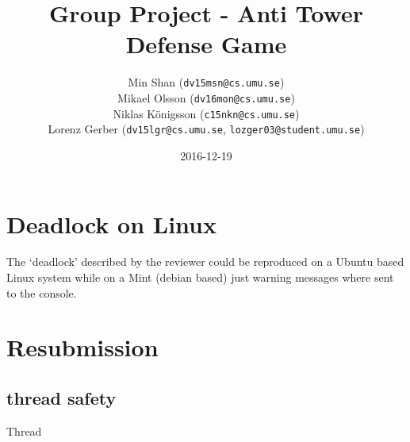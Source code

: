 \documentclass[a4paper,11pt,twoside]{article}
\title{Group Project - Anti Tower Defense Game}
\author{Min Shan ({\tt{dv15msn@cs.umu.se}}) \\ 
Mikael Olsson ({\tt{dv16mon@cs.umu.se}}) \\
Niklas Königsson ({\tt{c15nkn@cs.umu.se}}) \\
Lorenz Gerber ({\tt{dv15lgr@cs.umu.se}}, {\tt{lozger03@student.umu.se}})
}
\date{2016-12-19}
\begin{document}
\lstset{language=C}
\maketitle
\thispagestyle{empty}
\newpage
\tableofcontents
\thispagestyle{empty}
\newpage

\clearpage
{}
\section{Deadlock on Linux}
The `deadlock' described by the reviewer could be reproduced on a Ubuntu based Linux system while on a Mint (debian based) just warning messages where sent to the console. 
\section{Resubmission}
\subsection{thread safety}
Thread 







\end{document}
